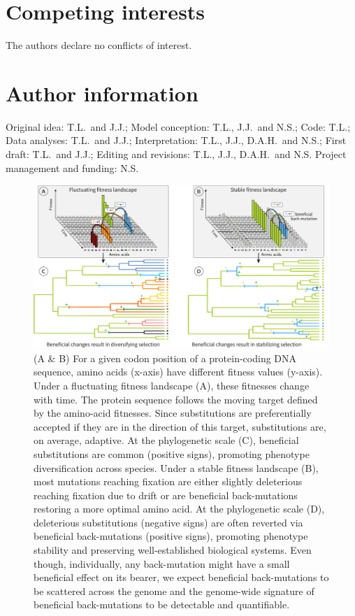 \documentclass{article}
\begin{document}
    \section*{Competing interests}
    The authors declare no conflicts of interest.

    \section*{Author information}
    Original idea: T.L.\ and J.J.;
    Model conception: T.L., J.J.\ and N.S.;
    Code: T.L.;
    Data analyses: T.L.\ and J.J.;
    Interpretation: T.L., J.J., D.A.H.\ and N.S.;
    First draft: T.L.\ and J.J.;
    Editing and revisions: T.L., J.J., D.A.H.\ and N.S.
    Project management and funding: N.S\@.

    \printbibliography
\newpage
    \begin{figure}[!htb]
        \centering
        \includegraphics[width=\textwidth, page=1] {artworks/figure.fitness-landscape}
        \caption{
            (A \& B) For a given codon position of a protein-coding DNA sequence, amino acids (x-axis) have different fitness values (y-axis).
            Under a fluctuating fitness landscape (A), these fitnesses change with time.
            The protein sequence follows the moving target defined by the amino-acid fitnesses. Since substitutions are preferentially accepted if they are in the direction of this target, substitutions are, on average, adaptive.
            At the phylogenetic scale (C), beneficial substitutions are common (positive signs), promoting phenotype diversification across species.
            Under a stable fitness landscape (B), most mutations reaching fixation are either slightly deleterious reaching fixation due to drift or are beneficial back-mutations restoring a more optimal amino acid.
            At the phylogenetic scale (D), deleterious substitutions (negative signs) are often reverted via beneficial back-mutations (positive signs), promoting phenotype stability and preserving well-established biological systems.
            Even though, individually, any back-mutation might have a small beneficial effect on its bearer, we expect beneficial back-mutations to be scattered across the genome and the genome-wide signature of beneficial back-mutations to be detectable and quantifiable.}
        \label{fig:fitness-landscape}
    \end{figure}
\end{document}
